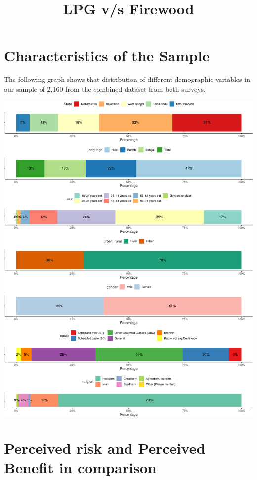 \documentclass[
]{article}
\title{LPG v/s Firewood}
\author{}
\date{\vspace{-2.5em}}
\begin{document}
\maketitle

{
\setcounter{tocdepth}{2}
\tableofcontents
}
\newpage

\hypertarget{characteristics-of-the-sample}{%
\section{Characteristics of the
Sample}\label{characteristics-of-the-sample}}

The following graph shows that distribution of different demographic
variables in our sample of 2,160 from the combined dataset from both
surveys.

\includegraphics[width=0.8\linewidth,height=0.8\textheight]{LPGversusFirewood_files/figure-latex/unnamed-chunk-6-1}

\newpage

\hypertarget{perceived-risk-and-perceived-benefit-in-comparison}{%
\section{Perceived risk and Perceived Benefit in
comparison}\label{perceived-risk-and-perceived-benefit-in-comparison}}
\end{document}

